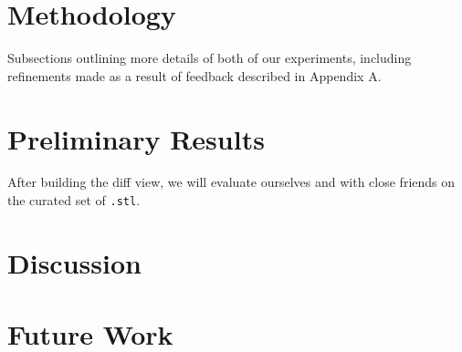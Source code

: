 \documentclass[sigconf,authorversion,nonacm]{acmart}
\begin{document}
\section{Methodology}

Subsections outlining more details of both of our experiments, including refinements made as a result of feedback described in Appendix A.

\section{Preliminary Results}

After building the diff view, we will evaluate ourselves and with close friends on the curated set of \texttt{.stl}.

\section{Discussion}

\section{Future Work}



\appendix
\end{document}
